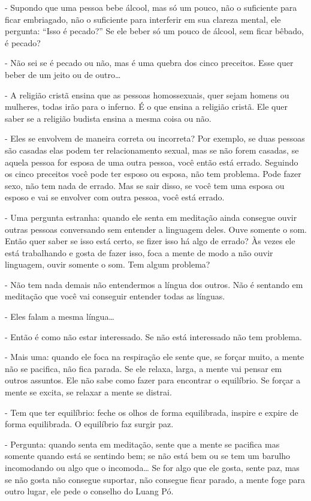 - Supondo que uma pessoa bebe álcool, mas só um pouco, não o
suficiente para ficar embriagado, não o suficiente para interferir em
sua clareza mental, ele pergunta: “Isso é pecado?” Se ele beber só um
pouco de álcool, sem ficar bêbado, é pecado?

- Não sei se é pecado ou não, mas é uma quebra dos cinco
preceitos. Esse quer beber de um jeito ou de outro…

- A religião cristã ensina que as pessoas homossexuais, quer sejam
homens ou mulheres, todas irão para o inferno. É o que ensina a
religião cristã. Ele quer saber se a religião budista ensina a mesma
coisa ou não.

- Eles se envolvem de maneira correta ou incorreta? Por exemplo,
se duas pessoas são casadas elas podem ter relacionamento sexual, mas
se não forem casadas, se aquela pessoa for esposa de uma outra pessoa,
você então está errado. Seguindo os cinco preceitos você pode ter
esposo ou esposa, não tem problema. Pode fazer sexo, não tem nada de
errado. Mas se sair disso, se você tem uma esposa ou esposo e vai se
envolver com outra pessoa, você está errado.

- Uma pergunta estranha: quando ele senta em meditação ainda
consegue ouvir outras pessoas conversando sem entender a linguagem
deles. Ouve somente o som. Então quer saber se isso está certo, se
fizer isso há algo de errado? Às vezes ele está trabalhando e gosta de
fazer isso, foca a mente de modo a não ouvir linguagem, ouvir somente o
som. Tem algum problema?

- Não tem nada demais não entendermos a língua dos outros. Não é
sentando em meditação que você vai conseguir entender todas as línguas.

- Eles falam a mesma língua…

- Então é como não estar interessado. Se não está interessado não
tem problema.

- Mais uma: quando ele foca na respiração ele sente que, se forçar
muito, a mente não se pacifica, não fica parada. Se ele relaxa, larga,
a mente vai pensar em outros assuntos. Ele não sabe como fazer para
encontrar o equilíbrio. Se forçar a mente se excita, se relaxar a mente
se distrai.

- Tem que ter equilíbrio: feche os olhos de forma equilibrada,
inspire e expire de forma equilibrada. O equilíbrio faz surgir paz.

- Pergunta: quando senta em meditação, sente que a mente se
pacifica mas somente quando está se sentindo bem; se não está bem ou se
tem um barulho incomodando ou algo que o incomoda… Se for algo que ele
gosta, sente paz, mas se não gosta não consegue suportar, não consegue
ficar parado, a mente foge para outro lugar, ele pede o conselho do
Luang Pó.

